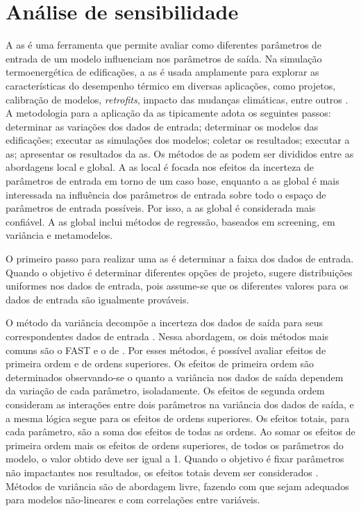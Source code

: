 \section{Análise de sensibilidade}

A \acrfull{as} é uma ferramenta que permite avaliar como diferentes parâmetros de entrada de um modelo influenciam nos parâmetros de saída. Na simulação termoenergética de edificações, a \acrshort{as} é usada amplamente para explorar as características do desempenho térmico em diversas aplicações, como projetos, calibração de modelos, \textit{retrofits}, impacto das mudanças climáticas, entre outros \cite{Tian2013a}. A metodologia para a aplicação da \acrshort{as} tipicamente adota os seguintes passos: determinar as variações dos dados de entrada; determinar os modelos das edificações; executar as simulações dos modelos; coletar os resultados; executar a \acrshort{as}; apresentar os resultados da \acrshort{as}. Os métodos de \acrshort{as} podem ser divididos entre as abordagens local e global. A \acrshort{as} local é focada nos efeitos da incerteza de parâmetros de entrada em torno de um caso base, enquanto a \acrshort{as} global é mais interessada na influência dos parâmetros de entrada sobre todo o espaço de parâmetros de entrada possíveis. Por isso, a \acrshort{as} global é considerada mais confiável. A \acrshort{as} global inclui métodos de regressão, baseados em screening, em variância e metamodelos.

O primeiro passo para realizar uma \acrshort{as} é determinar a faixa dos dados de entrada. Quando o objetivo é determinar diferentes opções de projeto,   sugere distribuições uniformes nos dados de entrada, pois assume-se que os diferentes valores para os dados de entrada são igualmente prováveis.

O método da variância decompõe a incerteza dos dados de saída para seus correspondentes dados de entrada  \cite{Tian2013a}. Nessa abordagem, os dois métodos mais comuns são o FAST \cite{Saltelli2004} e o de . 
Por esses métodos, é possível avaliar efeitos de primeira ordem e de ordens superiores.
Os efeitos de primeira ordem são determinados observando-se o quanto a variância nos dados de saída dependem da variação de cada parâmetro, isoladamente.
Os efeitos de segunda ordem consideram as interações entre dois parâmetros na variância dos dados de saída, e a mesma lógica segue para os efeitos de ordens superiores.
Os efeitos totais, para cada parâmetro, são a soma dos efeitos de todas as ordens.
Ao somar os efeitos de primeira ordem mais os efeitos de ordens superiores, de todos os parâmetros do modelo, o valor obtido deve ser igual a 1.
Quando o objetivo é fixar parâmetros não impactantes nos resultados, os efeitos totais devem ser considerados \cite{Saltelli2004}. Métodos de variância são de abordagem livre, fazendo com que sejam adequados para modelos não-lineares e com correlações entre variáveis.

